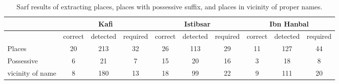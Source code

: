 

\begin{table}
  \begin{minipage}{\textwidth}
    \begin{tabular}{l|ccc|ccc|ccc}
    \hline \hline
    \multicolumn{1}{c}{} & \multicolumn{3}{c}{Kafi} & \multicolumn{3}{c}{Istibsar} & \multicolumn{3}{c}{Ibn Hanbal} \\
    \hline
          & correct & detected & required & correct & detected & required & correct & detected & required \\
    Places & 20    & 213   & 32    & 26    & 113   & 29    & 11    & 127   & 44 \\
    Possessive & 6     & 21    & 7     & 15    & 20    & 16    & 3     & 18    & 8 \\
    vicinity of name & 8     & 180   & 13    & 18    & 99    & 22    & 9     & 111   & 20 \\
    \hline \hline
    \end{tabular}%
    \end{minipage}
  \caption{Sarf results of extracting places, places with possessive suffix, and places in vicinity of proper names.}
  \label{tab:placesRes}%
\end{table}%

